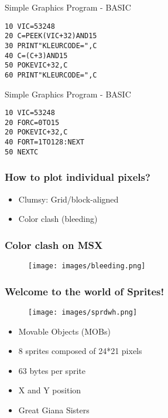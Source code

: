 
\begin{frame}[fragile]{Simple Graphics Program - BASIC}

\begin{lstlisting}
10 VIC=53248
20 C=PEEK(VIC+32)AND15
30 PRINT"KLEURCODE=",C
40 C=(C+3)AND15
50 POKEVIC+32,C
60 PRINT"KLEURCODE=",C
\end{lstlisting}

\end{frame}


\begin{frame}[fragile]{Simple Graphics Program - BASIC}

\begin{lstlisting}
10 VIC=53248
20 FORC=0TO15
20 POKEVIC+32,C
40 FORT=1TO128:NEXT
50 NEXTC
\end{lstlisting}

\end{frame}


\begin{frame}
\frametitle{How to plot individual pixels?}

\begin{itemize}
\item Clumsy: Grid/block-aligned
\item Color clash (bleeding)
\end{itemize}

\end{frame}


\begin{frame}
\frametitle{Color clash on MSX}

\begin{figure}
\texttt{[image: images/bleeding.png]}
\end{figure}

\end{frame}


\begin{frame}
\frametitle{Welcome to the world of Sprites!}

\begin{figure}
\texttt{[image: images/sprdwh.png]}
\end{figure}

\begin{itemize}
\item Movable Objects (MOBs)
\item 8 sprites composed of 24*21 pixels
\item 63 bytes per sprite
\item X and Y position
\item Great Giana Sisters
\end{itemize}

\end{frame}

